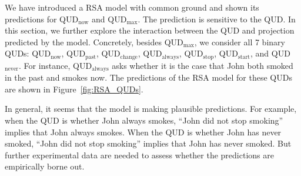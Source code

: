 We have introduced a RSA model with common ground and shown its
 predictions for QUD$_\textrm{now}$ and QUD$_\textrm{max}$.
The prediction is sensitive to the QUD. 
In this section, we further explore the interaction between the QUD and projection
 predicted by the model. 
Concretely, besides QUD$_\textrm{max}$, we consider all 7 binary QUDs: 
 QUD$_\text{now}$, QUD$_\text{past}$, QUD$_\text{change}$,
 QUD$_\text{always}$, QUD$_\text{stop}$, QUD$_\text{start}$, and QUD$_\text{never}$.
For instance, QUD$_\text{always}$ asks whether it is the case that John both smoked in
 the past and smokes now.
The predictions of the RSA model for these QUDs are shown in
 Figure~\ref{fig:RSA_QUDs}.
 
In general, it seems that the model is making plausible predictions. 
For example, when the QUD is whether John always smokes, ``John did not stop smoking'' implies that John always smokes. 
When the QUD is whether John has never smoked, ``John did not stop smoking'' implies that John has never smoked. 
But further experimental data are needed to assess whether the predictions are empirically borne out.


